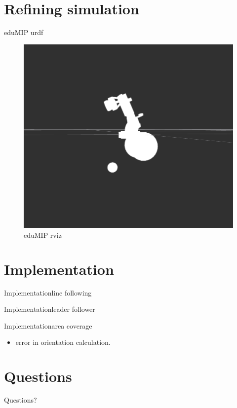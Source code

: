 \documentclass{beamer}
\begin{document}
\section{Refining simulation}
\begin{frame}{eduMIP urdf}
\begin{center}
\begin{figure}
\includegraphics[scale=0.25]{figs/img/rviz.png}
\caption{eduMIP rviz}
\end{figure}
\end{center}
\end{frame}
\section{Implementation}
\begin{frame}{Implementation}{line following}
\end{frame}
\begin{frame}{Implementation}{leader follower}
\end{frame}
\begin{frame}{Implementation}{area coverage}
\begin{itemize}
\item error in orientation calculation.
\end{itemize}
\end{frame}
\section*{Questions}
\begin{frame}
\begin{LARGE}
\begin{center}
Questions?
\end{center}
\end{LARGE}
\end{frame}
\end{document}
